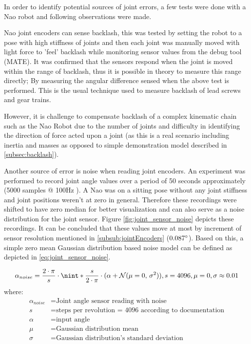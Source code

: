\documentclass[english, printversion, nomenclature, notitle]{tuvisionthesis} %
\DeclarePairedDelimiter{\nint}\lfloor\rceil
\begin{document}
In order to identify potential sources of joint errors, a few tests were done with a Nao robot and following observations were made.

Nao joint encoders can sense backlash, this was tested by setting the robot to a pose with high stiffness of joints and then each joint was manually moved with light force to 'feel' backlash while monitoring sensor values from the debug tool (MATE). It was confirmed that the sensors respond when the joint is moved within the range of backlash, thus it is possible in theory to measure this range directly; By measuring the angular difference sensed when the above test is performed. This is the usual technique used to measure backlash of lead screws and gear trains.

However, it is challenge to compensate backlash of a complex kinematic chain such as the Nao Robot due to the number of joints and difficulty in identifying the direction of force acted upon a joint (as this is a real scenario including inertia and masses as opposed to simple demonstration model described in \cref{subsec:backlash}).

Another source of error is noise when reading joint encoders. An experiment was performed to record joint angle values over a period of 50 seconds approximately (5000 samples @ 100Hz ). A Nao was on a sitting pose without any joint stiffness and joint positions weren't at zero in general. Therefore these recordings were shifted to have zero median for better visualization and can also serve as a noise distribution for the joint sensor. Figure \ref{fig:joint_sensor_noise} depicts these recordings. It can be concluded that these values move at most by increment of sensor resolution mentioned in \cref{subsub:jointEncoders} ($0.087\degree$). Based on this, a simple zero mean Gaussian distribution based noise model can be defined as depicted in \cref{eq:joint_sensor_noise}.

\begin{equation}
	\alpha_{noise} = \frac{2 \cdot \pi}{s} \cdot \nint*{\frac{s}{2 \cdot \pi } \cdot ( \alpha + \mathcal{N}(\mu = 0,\,\sigma^{2}))}, s = 4096, \mu = 0, \sigma \approx 0.01
	\label{eq:joint_sensor_noise}
\end{equation}
where:
\begin{align*}
	\alpha_{noise} &= \text{Joint angle sensor reading with noise}\\
	s &= \text{steps per revolution = 4096 according to documentation}\\
	\alpha &= \text{input angle}\\
	\mu &= \text{Gaussian distribution mean}\\
	\sigma &= \text{Gaussian distribution's standard deviation}
\end{align*}
\end{document}
